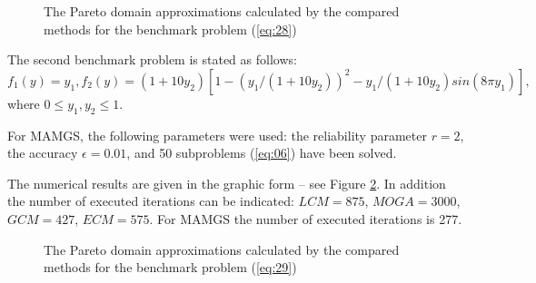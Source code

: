 \documentclass[smallcondensed]{svjour3}     %
\begin{document}
\begin{figure}
\caption{The Pareto domain approximations calculated by the compared methods for the benchmark problem (\ref{eq:28})}
\label{fig:03}
\end{figure}

The second benchmark problem is stated as follows:
\begin{equation}\label{eq:29}
f_1 (y)=y_1,f_2 (y)=(1+10y_2 ) \left[1-(y_1/(1+ 10 y_2 ))^2-y_1/(1+10y_2 ) sin⁡(8 \pi y_1) \right],
\end{equation}
where $0 \leq y_1,y_2 \leq 1$.\par

For MAMGS, the following parameters were used: the reliability parameter $r=2$, the accuracy $\epsilon = 0.01$, and 50 subproblems (\ref{eq:06}) have been solved.\par

The numerical results are given in the graphic form -- see Figure \ref{fig:04}. In addition the number of executed iterations can be indicated: $LCM=875$, $MOGA=3000$, $GCM=427$, $ECM=575$. For MAMGS the number of executed iterations is 277.

\begin{figure}
\caption{The Pareto domain approximations calculated by the compared methods for the benchmark problem (\ref{eq:29})}
\label{fig:04}
\end{figure}
\end{document}
